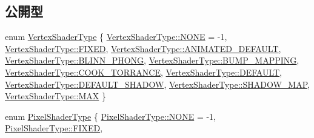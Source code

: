 \subsection*{公開型}
\begin{DoxyCompactItemize}
\item 
enum \mbox{\hyperlink{class_shader_manager_a9b51e49d70eb3cc58f6d1f3994e8cfbd}{Vertex\+Shader\+Type}} \{ \newline
\mbox{\hyperlink{class_shader_manager_a9b51e49d70eb3cc58f6d1f3994e8cfbdab50339a10e1de285ac99d4c3990b8693}{Vertex\+Shader\+Type\+::\+N\+O\+NE}} = -\/1, 
\mbox{\hyperlink{class_shader_manager_a9b51e49d70eb3cc58f6d1f3994e8cfbdac6e6dc18b53b4c2681394b9d8aefcec7}{Vertex\+Shader\+Type\+::\+F\+I\+X\+ED}}, 
\mbox{\hyperlink{class_shader_manager_a9b51e49d70eb3cc58f6d1f3994e8cfbdaf444cdeee40506a39576522e6e8d57e7}{Vertex\+Shader\+Type\+::\+A\+N\+I\+M\+A\+T\+E\+D\+\_\+\+D\+E\+F\+A\+U\+LT}}, 
\mbox{\hyperlink{class_shader_manager_a9b51e49d70eb3cc58f6d1f3994e8cfbdaf80d3ff63cd812f78f5a29ba2d16eb6a}{Vertex\+Shader\+Type\+::\+B\+L\+I\+N\+N\+\_\+\+P\+H\+O\+NG}}, 
\newline
\mbox{\hyperlink{class_shader_manager_a9b51e49d70eb3cc58f6d1f3994e8cfbda5c4b81b1405aff819dd62e30779f3971}{Vertex\+Shader\+Type\+::\+B\+U\+M\+P\+\_\+\+M\+A\+P\+P\+I\+NG}}, 
\mbox{\hyperlink{class_shader_manager_a9b51e49d70eb3cc58f6d1f3994e8cfbda52a264ced6adec1e020fdc1f1c805bc2}{Vertex\+Shader\+Type\+::\+C\+O\+O\+K\+\_\+\+T\+O\+R\+R\+A\+N\+CE}}, 
\mbox{\hyperlink{class_shader_manager_a9b51e49d70eb3cc58f6d1f3994e8cfbda5b39c8b553c821e7cddc6da64b5bd2ee}{Vertex\+Shader\+Type\+::\+D\+E\+F\+A\+U\+LT}}, 
\mbox{\hyperlink{class_shader_manager_a9b51e49d70eb3cc58f6d1f3994e8cfbdaa2a014751c249304425363067adf2782}{Vertex\+Shader\+Type\+::\+D\+E\+F\+A\+U\+L\+T\+\_\+\+S\+H\+A\+D\+OW}}, 
\newline
\mbox{\hyperlink{class_shader_manager_a9b51e49d70eb3cc58f6d1f3994e8cfbda5b266596cf5123fb91b9f8fe371dbb03}{Vertex\+Shader\+Type\+::\+S\+H\+A\+D\+O\+W\+\_\+\+M\+AP}}, 
\mbox{\hyperlink{class_shader_manager_a9b51e49d70eb3cc58f6d1f3994e8cfbda26a4b44a837bf97b972628509912b4a5}{Vertex\+Shader\+Type\+::\+M\+AX}}
 \}
\item 
enum \mbox{\hyperlink{class_shader_manager_a7d15d773b3c6a99dd7086c45c8b0be5f}{Pixel\+Shader\+Type}} \{ \newline
\mbox{\hyperlink{class_shader_manager_a7d15d773b3c6a99dd7086c45c8b0be5fab50339a10e1de285ac99d4c3990b8693}{Pixel\+Shader\+Type\+::\+N\+O\+NE}} = -\/1, 
\mbox{\hyperlink{class_shader_manager_a7d15d773b3c6a99dd7086c45c8b0be5fac6e6dc18b53b4c2681394b9d8aefcec7}{Pixel\+Shader\+Type\+::\+F\+I\+X\+ED}}, 

\end{DoxyCompactItemize}
